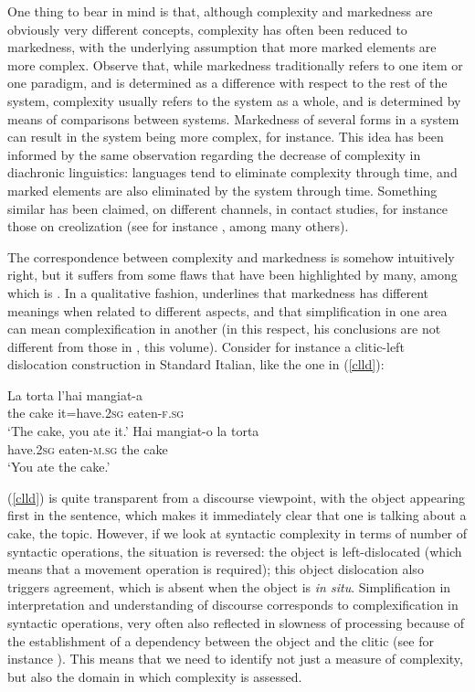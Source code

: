 \documentclass[output=paper]{langscibook}
\begin{document}
One thing to bear in mind is that, although complexity and markedness are obviously very different concepts, complexity has often been reduced to markedness, with the underlying assumption that more marked elements are more complex. Observe that, while markedness traditionally refers to one item or one paradigm, and is determined as a difference with respect to the rest of the system, complexity usually refers to the system as a whole, and is determined by means of comparisons between systems. Markedness of several forms in a system can result in the system being more complex, for instance. This idea has been informed by the same observation regarding the decrease of complexity in diachronic linguistics: languages tend to eliminate complexity through time, and marked elements are also eliminated by the system through time. Something similar has been claimed, on different channels, in contact studies, for instance those on creolization (see for instance \citealt{McWhorter2001}, among many others). 

The correspondence between complexity and markedness is somehow intuitively right, but it suffers from some flaws that have been highlighted by many, among which is \citet{Haspelmath2006}. In a qualitative fashion, \citeauthor{Haspelmath2006} underlines that markedness has different meanings when related to different aspects, and that simplification in one area can mean complexification in another (in this respect, his conclusions are not different from those in \citeauthor{chapters/varatharaj}, this volume). %
Consider for instance a clitic-left dislocation construction in Standard Italian, like the one in (\ref{clld}):
\begin{exe} 
\ex \begin{xlist}
\ex \label{clld}\gll 
La torta l'hai          mangiat-a\\
the cake it=have.\textsc{2sg}   eaten-\textsc{f.sg} \\
\glt `The cake, you ate it.'
\ex \gll 
Hai mangiat-o la torta \\
have.\textsc{2sg} eaten-\textsc{m.sg} the cake \\
\glt `You ate the cake.'
\end{xlist}
\end{exe}
(\ref{clld}) is quite transparent from a discourse viewpoint, with the object appearing first in the sentence, which makes it immediately clear that one is talking about a cake, the topic. However, if we look at syntactic complexity in terms of number of syntactic operations, the situation is reversed: the object is left-dislocated (which means that a movement operation is required); this object dislocation also triggers agreement, which is absent when the object is \textit{in situ}. Simplification in interpretation and understanding of discourse corresponds to complexification in syntactic operations, very often also reflected in slowness of processing because of the establishment of a dependency between the object and the clitic (see for instance \citealt{ValleHootCabrelli}). This means that we need to identify not just a measure of complexity, but also the domain in which complexity is assessed. 
\end{document}
